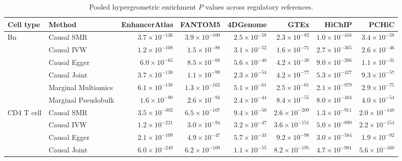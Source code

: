 \begin{table}[htbp]
\centering
\caption[Pooled hypergeometric enrichment $P$ values]{Pooled hypergeometric enrichment $P$ values across regulatory references.}
\label{tab:supp-hyper-p}
\begingroup
\small
\singlespacing
\setlength{\tabcolsep}{2.2pt}
\renewcommand{\arraystretch}{1.35}
\begin{tabular}{@{}llrrrrrr@{}}
\toprule
Cell type & Method & EnhancerAtlas & FANTOM5 & 4DGenome & GTEx & HiChIP & PCHiC \\
\midrule
Bn & Causal SMR & \(3.7\times10^{-136}\) & \(3.9\times10^{-100}\) & \(2.5\times10^{-58}\) & \(2.3\times10^{-82}\) & \(1.0\times10^{-416}\) & \(3.4\times10^{-58}\) \\
 & Causal IVW & \(1.2\times10^{-108}\) & \(1.5\times10^{-88}\) & \(3.1\times10^{-52}\) & \(1.6\times10^{-71}\) & \(2.7\times10^{-365}\) & \(2.6\times10^{-46}\) \\
 & Causal Egger & \(6.0\times10^{-65}\) & \(8.5\times10^{-68}\) & \(5.6\times10^{-40}\) & \(4.2\times10^{-38}\) & \(9.0\times10^{-286}\) & \(1.1\times10^{-31}\) \\
 & Causal Joint & \(3.7\times10^{-130}\) & \(1.1\times10^{-99}\) & \(2.3\times10^{-54}\) & \(4.2\times10^{-77}\) & \(5.3\times10^{-427}\) & \(9.3\times10^{-57}\) \\
 & Marginal Multiomics & \(6.1\times10^{-138}\) & \(1.3\times10^{-162}\) & \(5.1\times10^{-61}\) & \(2.5\times10^{-61}\) & \(2.1\times10^{-879}\) & \(2.9\times10^{-75}\) \\
 & Marginal Pseudobulk & \(1.6\times10^{-80}\) & \(2.6\times10^{-94}\) & \(2.4\times10^{-44}\) & \(8.4\times10^{-55}\) & \(8.0\times10^{-404}\) & \(4.0\times10^{-54}\) \\
\midrule
CD4 T cell & Causal SMR & \(3.5\times10^{-302}\) & \(6.5\times10^{-107}\) & \(9.4\times10^{-50}\) & \(2.6\times10^{-209}\) & \(1.3\times10^{-911}\) & \(2.0\times10^{-140}\) \\
 & Causal IVW & \(1.2\times10^{-221}\) & \(3.0\times10^{-94}\) & \(3.2\times10^{-47}\) & \(3.6\times10^{-151}\) & \(5.0\times10^{-890}\) & \(2.2\times10^{-154}\) \\
 & Causal Egger & \(2.1\times10^{-109}\) & \(4.9\times10^{-47}\) & \(5.7\times10^{-33}\) & \(9.2\times10^{-98}\) & \(3.0\times10^{-584}\) & \(1.9\times10^{-92}\) \\
 & Causal Joint & \(6.0\times10^{-249}\) & \(6.2\times10^{-109}\) & \(1.1\times10^{-55}\) & \(8.2\times10^{-195}\) & \(4.7\times10^{-981}\) & \(5.6\times10^{-160}\) \\

\end{tabular}
\end{table}
